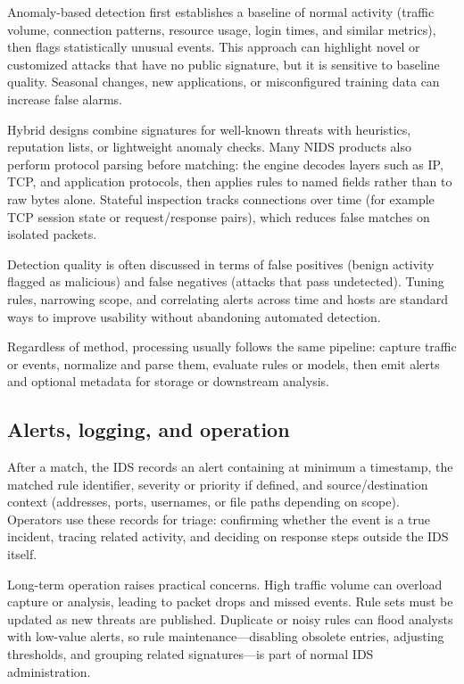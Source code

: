 \documentclass[../main.tex]{subfiles}
\begin{document}
Anomaly-based detection first establishes a baseline of normal activity (traffic volume, connection patterns, resource usage, login times, and similar metrics), then flags statistically unusual events. This approach can highlight novel or customized attacks that have no public signature, but it is sensitive to baseline quality. Seasonal changes, new applications, or misconfigured training data can increase false alarms.

Hybrid designs combine signatures for well-known threats with heuristics, reputation lists, or lightweight anomaly checks. Many NIDS products also perform protocol parsing before matching: the engine decodes layers such as IP, TCP, and application protocols, then applies rules to named fields rather than to raw bytes alone. Stateful inspection tracks connections over time (for example TCP session state or request/response pairs), which reduces false matches on isolated packets.

Detection quality is often discussed in terms of false positives (benign activity flagged as malicious) and false negatives (attacks that pass undetected). Tuning rules, narrowing scope, and correlating alerts across time and hosts are standard ways to improve usability without abandoning automated detection.

Regardless of method, processing usually follows the same pipeline: capture traffic or events, normalize and parse them, evaluate rules or models, then emit alerts and optional metadata for storage or downstream analysis.

\subsection{Alerts, logging, and operation}

After a match, the IDS records an alert containing at minimum a timestamp, the matched rule identifier, severity or priority if defined, and source/destination context (addresses, ports, usernames, or file paths depending on scope). Operators use these records for triage: confirming whether the event is a true incident, tracing related activity, and deciding on response steps outside the IDS itself.

Long-term operation raises practical concerns. High traffic volume can overload capture or analysis, leading to packet drops and missed events. Rule sets must be updated as new threats are published. Duplicate or noisy rules can flood analysts with low-value alerts, so rule maintenance---disabling obsolete entries, adjusting thresholds, and grouping related signatures---is part of normal IDS administration.
\end{document}
